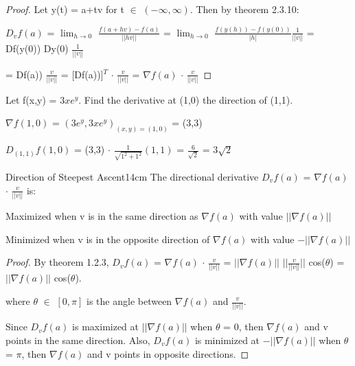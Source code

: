     \begin{proof}
        Let y(t) = a+tv for t $\in$ $(-\infty,\infty)$.
        Then by {\color{red} theorem 2.3.10}:

        \hspace{0.5cm}
        $D_vf(a)$
        = $\lim_{h \rightarrow 0}$ $\frac{f(a+hv) - f(a)}{||hv||}$
        = $\lim_{h \rightarrow 0}$ $\frac{f(y(h)) - f(y(0))}{|h|} \frac{1}{||v||}$
        = Df(y(0)) Dy(0) $\frac{1}{||v||}$

        \hspace{1.95cm}
        = Df(a)) $\frac{v}{||v||}$
        = [Df(a))]$^T$ $\cdot$ $\frac{v}{||v||}$
        = $\nabla f(a)$ $\cdot$ $\frac{v}{||v||}$
    \end{proof}

    \vspace{0.5cm}



    \begin{example}
        Let f(x,y) = $3xe^y$. Find the derivative at (1,0) the direction of (1,1).
    \end{example}

    \begin{tbox}
        $\nabla f(1,0)$
        = $(3e^y,3xe^y)_{(x,y)=(1,0)}$
        = (3,3)

        $D_{(1,1)}f(1,0)$
        = (3,3) $\cdot$ $\frac{1}{\sqrt{1^2+1^2}}(1,1)$
        = $\frac{6}{\sqrt{2}}$
        = $3\sqrt{2}$
    \end{tbox}

    \vspace{0.5cm}



    \begin{wtheorem}{Direction of Steepest Ascent}{14cm}
        The directional derivative
        $D_vf(a)$ = $\nabla f(a)$ $\cdot$ $\frac{v}{||v||}$ is:
        
        \hspace{0.3cm}
        Maximized when v is in the same direction as $\nabla f(a)$
        with value $||\nabla f(a)||$

        \hspace{0.3cm}
        Minimized when v is in the opposite direction of $\nabla f(a)$
        with value $-||\nabla f(a)||$
    \end{wtheorem}

    \begin{proof}
        By {\color{red} theorem 1.2.3},
        $D_vf(a)$
        = $\nabla f(a)$ $\cdot$ $\frac{v}{||v||}$
        = $||\nabla f(a)||$ $||\frac{v}{||v||}||$ cos($\theta$)
        = $||\nabla f(a)||$ cos($\theta$).
        
        where $\theta$ $\in$ $[0,\pi]$ is the angle between
        $\nabla f(a)$ and $\frac{v}{||v||}$.

        Since $D_vf(a)$ is maximized at $||\nabla f(a)||$ when $\theta$ = 0,
        then $\nabla f(a)$ and v points in the same direction.
        Also, $D_vf(a)$ is minimized at $-||\nabla f(a)||$ when $\theta$ = $\pi$,
        then $\nabla f(a)$ and v points in opposite directions.
    \end{proof}

